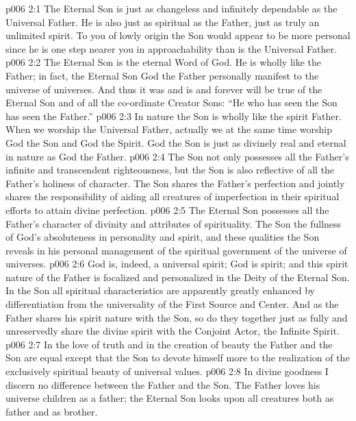 \vs p006 2:1 The Eternal Son is just as changeless and infinitely dependable as the Universal Father. He is also just as spiritual as the Father, just as truly an unlimited spirit. To you of lowly origin the Son would appear to be more personal since he is one step nearer you in approachability than is the Universal Father.
\vs p006 2:2 The Eternal Son is the eternal Word of God. He is wholly like the Father; in fact, the Eternal Son  God the Father personally manifest to the universe of universes. And thus it was and is and forever will be true of the Eternal Son and of all the co\hyp{}ordinate Creator Sons: “He who has seen the Son has seen the Father.”
\vs p006 2:3 In nature the Son is wholly like the spirit Father. When we worship the Universal Father, actually we at the same time worship God the Son and God the Spirit. God the Son is just as divinely real and eternal in nature as God the Father.
\vs p006 2:4 The Son not only possesses all the Father’s infinite and transcendent righteousness, but the Son is also reflective of all the Father’s holiness of character. The Son shares the Father’s perfection and jointly shares the responsibility of aiding all creatures of imperfection in their spiritual efforts to attain divine perfection.
\vs p006 2:5 The Eternal Son possesses all the Father’s character of divinity and attributes of spirituality. The Son  the fullness of God’s absoluteness in personality and spirit, and these qualities the Son reveals in his personal management of the spiritual government of the universe of universes.
\vs p006 2:6 God is, indeed, a universal spirit; God is spirit; and this spirit nature of the Father is focalized and personalized in the Deity of the Eternal Son. In the Son all spiritual characteristics are apparently greatly enhanced by differentiation from the universality of the First Source and Center. And as the Father shares his spirit nature with the Son, so do they together just as fully and unreservedly share the divine spirit with the Conjoint Actor, the Infinite Spirit.
\vs p006 2:7 In the love of truth and in the creation of beauty the Father and the Son are equal except that the Son  to devote himself more to the realization of the exclusively spiritual beauty of universal values.
\vs p006 2:8 In divine goodness I discern no difference between the Father and the Son. The Father loves his universe children as a father; the Eternal Son looks upon all creatures both as father and as brother.
